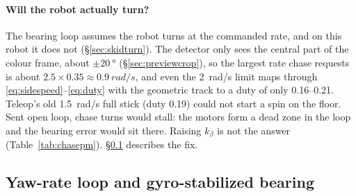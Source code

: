 \paragraph{Will the robot actually turn?} The bearing loop assumes the
robot turns at the commanded rate, and on this robot it does not
(\S\ref{sec:skidturn}). The detector only sees the central part of the
colour frame, about $\pm\SI{20}{\degree}$ (\S\ref{sec:previewcrop}), so the
largest rate chase requests is about $2.5\times0.35\approx\SI{0.9}{rad/s}$,
and even the \SI{2}{rad/s} limit maps through
\eqref{eq:sidespeed}--\eqref{eq:duty} with the geometric track to a duty of
only 0.16--0.21. Teleop's
old \SI{1.5}{rad/s} full stick (duty 0.19) could not start a spin on the
floor. Sent open loop, chase turns would stall: the motors form a dead zone
in the loop and the bearing error would sit there. Raising $k_\beta$ is not
the answer (Table~\ref{tab:chasepm}). \S\ref{sec:chaseyaw} describes the fix.

\subsection{Yaw-rate loop and gyro-stabilized bearing}
\label{sec:chaseyaw}

